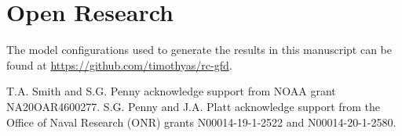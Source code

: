\documentclass[draft]{agujournal2019}
\begin{document}
%
%









\appendix




\newpage
\section{Open Research}

The model configurations used to generate the results in this manuscript can be
found at \url{https://github.com/timothyas/rc-gfd}.


\acknowledgments

T.A. Smith and S.G. Penny acknowledge support from NOAA grant NA20OAR4600277.
S.G. Penny and J.A. Platt acknowledge support from the Office of Naval Research
(ONR) grants N00014-19-1-2522 and N00014-20-1-2580.



%

\end{document}
